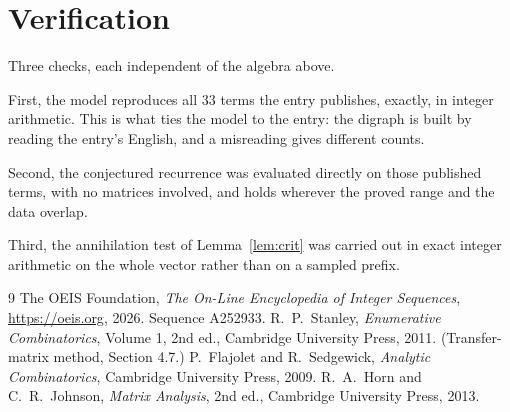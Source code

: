 \documentclass[11pt,a4paper]{article}
\theoremstyle{plain}
\theoremstyle{definition}
\begin{document}
\section{Verification}

Three checks, each independent of the algebra above.

First, the model reproduces all $33$ terms the entry publishes, exactly, in integer
arithmetic. This is what ties the model to the entry: the digraph is built by reading the
entry's English, and a misreading gives different counts.

Second, the conjectured recurrence was evaluated directly on those published terms, with no
matrices involved, and holds wherever the proved range and the data overlap.

Third, the annihilation test of Lemma~\ref{lem:crit} was carried out in exact integer
arithmetic on the whole vector rather than on a sampled prefix.

\begin{thebibliography}{9}
 The OEIS Foundation, \emph{The On-Line Encyclopedia of Integer
Sequences}, \url{https://oeis.org}, 2026. Sequence A252933.
 R.~P.~Stanley, \emph{Enumerative Combinatorics}, Volume 1, 2nd ed.,
Cambridge University Press, 2011. (Transfer-matrix method, Section 4.7.)
 P.~Flajolet and R.~Sedgewick, \emph{Analytic Combinatorics}, Cambridge
University Press, 2009.
 R.~A.~Horn and C.~R.~Johnson, \emph{Matrix Analysis}, 2nd ed., Cambridge
University Press, 2013.
\end{thebibliography}
\end{document}
